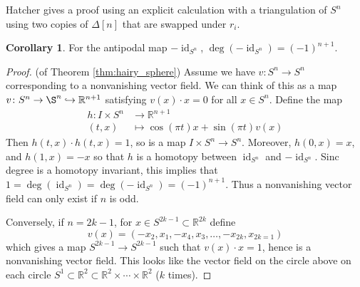 \documentclass{tufte-handout}
\def\into {\hookrightarrow}
\def\RR{\mathbb{R}}
\DeclareMathOperator{\id}{id}
\DeclareMathOperator{\Deg}{deg}
\theoremstyle{definition}
\newtheorem{corollary}{Corollary}
\begin{document}
Hatcher gives a proof using an explicit calculation with a triangulation of $S^n$ using two copies of $\Delta[n]$ that are swapped under $r_i$.

\begin{corollary}
For the antipodal map $-\id_{S^n}$, $\Deg(-\id_{S^n}) = (-1)^{n+1}$.
\end{corollary}

\begin{proof}{(of Theorem \ref{thm:hairy_sphere})}
Assume we have $v\colon S^n\to S^n$ corresponding to a nonvanishing vector field. We can think of this as a map $v\colon S^n \to \S^n \into \RR^{n+1}$ satisfying $v(x)\cdot x = 0$ for all $x\in S^n$. Define the map
\begin{align*}
h\colon I \times S^n & \to \RR^{n+1}\\
(t,x) & \mapsto \cos(\pi t) x + \sin(\pi t) v(x)
\end{align*}
Then $h(t,x)\cdot h(t,x) = 1$, so is a map $I\times S^n \to S^n$. Moreover, $h(0,x) = x$, and $h(1,x)=-x$ so that $h$ is a homotopy between $\id_{S^n}$ and $-\id_{S^n}$. Sinc degree is a homotopy invariant, this implies that $1 = \Deg(\id_{S^n}) = \Deg(-\id_{S^n}) = (-1)^{n+1}$. Thus a nonvanishing vector field can only exist if $n$ is odd.

Conversely, if $n=2k-1$, for $x\in S^{2k-1} \subset\RR^{2k}$ define 
\[
	v(x) = (-x_2,x_1,-x_4,x_3,\ldots,-x_{2k},x_{2k=1})
\]
which gives a map $S^{2k-1} \to S^{2k-1}$ such that $v(x)\cdot x = 1$, hence is a nonvanishing vector field. This looks like the vector field on the circle above on each circle $S^1 \subset \RR^2 \subset \RR^2 \times \cdots \times \RR^2$ ($k$ times).


\end{proof}
\end{document}
